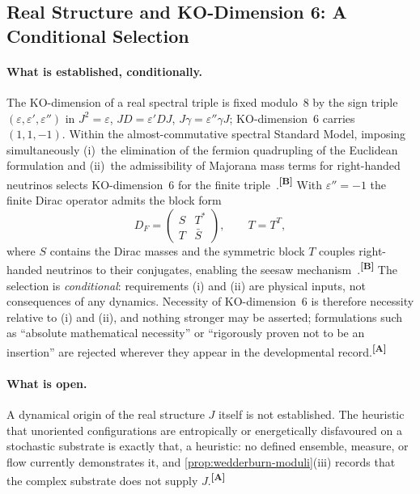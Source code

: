 \documentclass[12pt,a4paper,twoside]{article}
\theoremstyle{plain}
\theoremstyle{definition}
\theoremstyle{remark}
\newcommand{\catmark}[1]{\textsuperscript{\textsf{\textbf{[#1]}}}}
\begin{document}
\subsection{Real Structure and KO-Dimension 6: A Conditional Selection}
\label{subsec:attractor-ko6}

\paragraph{What is established, conditionally.}
The KO-dimension of a real spectral triple is fixed modulo~8 by the sign
triple $(\varepsilon,\varepsilon',\varepsilon'')$ in
$J^2=\varepsilon$, $JD=\varepsilon'DJ$, $J\gamma=\varepsilon''\gamma J$;
KO-dimension~6 carries $(1,1,-1)$. Within the almost-commutative spectral
Standard Model, imposing simultaneously (i)~the elimination of the
fermion quadrupling of the Euclidean formulation and (ii)~the
admissibility of Majorana mass terms for right-handed neutrinos selects
KO-dimension~6 for the finite
triple~\cite{barrett2007,connes2006,ccm2007}.\catmark{B} With
$\varepsilon''=-1$ the finite Dirac operator admits the block form
\[
D_F=\begin{pmatrix} S & T^{*}\\[2pt] T & \bar S\end{pmatrix},
\qquad T=T^{T},
\]
where $S$ contains the Dirac masses and the symmetric block $T$ couples
right-handed neutrinos to their conjugates, enabling the seesaw
mechanism~\cite{connes2006,ccm2007}.\catmark{B} The selection is
\emph{conditional}: requirements (i) and (ii) are physical inputs, not
consequences of any dynamics. Necessity of KO-dimension~6 is therefore
necessity relative to (i) and (ii), and nothing stronger may be asserted;
formulations such as ``absolute mathematical necessity'' or ``rigorously
proven not to be an insertion'' are rejected wherever they appear in the
developmental record.\catmark{A}

\paragraph{What is open.}
A dynamical origin of the real structure $J$ itself is not established.
The heuristic that unoriented configurations are entropically or
energetically disfavoured on a stochastic substrate is exactly that, a
heuristic: no defined ensemble, measure, or flow currently demonstrates
it, and \cref{prop:wedderburn-moduli}(iii) records that the complex
substrate does not supply $J$.\catmark{A}
\end{document}
